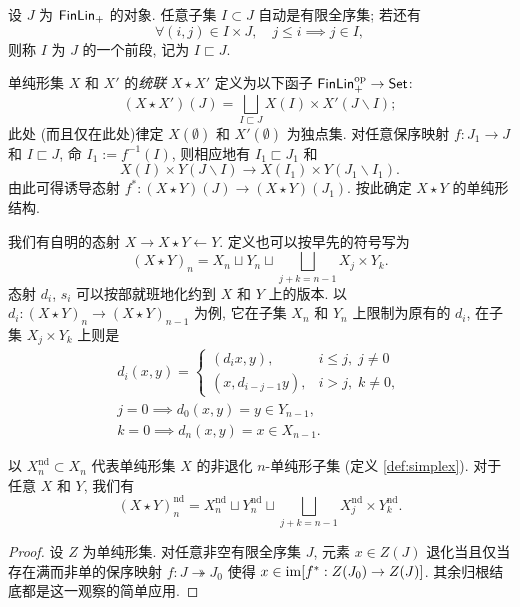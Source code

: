 \begin{convention}
	设 $J$ 为 $\mathsf{FinLin}_+$ 的对象. 任意子集 $I \subset J$ 自动是有限全序集; 若还有
	\[ \forall (i, j) \in I \times J, \quad j \leq i \implies j \in I, \]
	则称 $I$ 为 $J$ 的一个前段, 记为 $I \sqsubset J$.
\end{convention}

\begin{definition}\label{def:simplicial-join}
	单纯形集 $X$ 和 $X'$ 的\emph{统联} $X \star X'$ 定义为以下函子 $\mathsf{FinLin}_+^{\operatorname{op}} \to \mathsf{Set}$:
	\[ (X \star X')(J) = \bigsqcup_{I \sqsubset J} X(I) \times X'(J \smallsetminus I); \]
	此处 (而且仅在此处)律定 $X(\emptyset)$ 和 $X'(\emptyset)$ 为独点集. 对任意保序映射 $f: J_1 \to J$ 和 $I \sqsubset J$, 命 $I_1 := f^{-1}(I)$, 则相应地有 $I_1 \sqsubset J_1$ 和
	\[ X(I) \times Y(J \smallsetminus I) \to X(I_1) \times Y(J_1 \smallsetminus I_1). \]
	由此可得诱导态射 $f^*: (X \star Y)(J) \to (X \star Y)(J_1)$. 按此确定 $X \star Y$ 的单纯形结构.
\end{definition}

我们有自明的态射 $X \rightarrow X \star Y \leftarrow Y$. 定义也可以按早先的符号写为
\[ (X \star Y)_n = X_n \sqcup Y_n \sqcup \bigsqcup_{j+k = n-1} X_j \times Y_k .\]
态射 $d_i$, $s_i$ 可以按部就班地化约到 $X$ 和 $Y$ 上的版本. 以 $d_i: (X \star Y)_n \to (X \star Y)_{n-1}$ 为例, 它在子集 $X_n$ 和 $Y_n$ 上限制为原有的 $d_i$, 在子集 $X_j \times Y_k$ 上则是
\begin{equation}\label{eqn:join-formulas}\begin{gathered}
		d_i(x, y) = \begin{cases}
			(d_i x, y), & i \leq j, \; j \neq 0 \\
			(x, d_{i-j-1} y), & i > j, \; k \neq 0,
		\end{cases} \\
		j=0 \implies d_0(x, y) = y \in Y_{n-1}, \\
		k=0 \implies d_n(x, y) = x \in X_{n-1}.
\end{gathered}\end{equation}

\begin{proposition}\label{prop:join-nd}
	以 $X^{\mathrm{nd}}_n \subset X_n$ 代表单纯形集 $X$ 的非退化 $n$-单纯形子集 (定义 \ref{def:simplex}). 对于任意 $X$ 和 $Y$, 我们有
	\[ (X \star Y)^{\mathrm{nd}}_n = X^{\mathrm{nd}}_n \sqcup Y^{\mathrm{nd}}_n \sqcup \bigsqcup_{j+k=n-1} X^{\mathrm{nd}}_j \times Y^{\mathrm{nd}}_k. \]
\end{proposition}
\begin{proof}
	设 $Z$ 为单纯形集. 对任意非空有限全序集 $J$, 元素 $x \in Z(J)$ 退化当且仅当存在满而非单的保序映射 $f: J \twoheadrightarrow J_0$ 使得 $x \in \operatorname{im}[f^*: Z(J_0) \to Z(J)]$. 其余归根结底都是这一观察的简单应用.
\end{proof}

